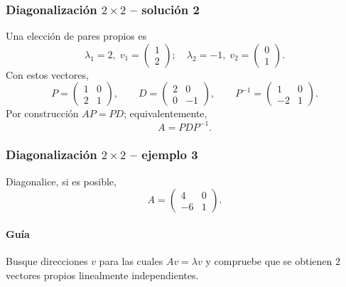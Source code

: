 \subsubsection*{Diagonalización $2\times 2$ -- solución 2}
\scriptsize
Una elección de pares propios es
\[
\lambda_1=2,\;v_1=\begin{pmatrix}1\\2\end{pmatrix};\quad \lambda_2=-1,\;v_2=\begin{pmatrix}0\\1\end{pmatrix}.
\]
Con estos vectores,
\[
P=\begin{pmatrix}1 & 0\\2 & 1\end{pmatrix},\qquad D=\begin{pmatrix}2 & 0\\0 & -1\end{pmatrix},\qquad P^{-1}=\begin{pmatrix}1 & 0\\-2 & 1\end{pmatrix}.
\]
Por construcción $AP=PD$; equivalentemente,
\[
\boxed{A=PDP^{-1}}.
\]


\subsubsection*{Diagonalización $2\times 2$ -- ejemplo 3}

Diagonalice, si es posible,
\[
A=\begin{pmatrix}4 & 0\\-6 & 1\end{pmatrix}.
\]

\paragraph{Guía}
Busque direcciones $v$ para las cuales $Av=\lambda v$ y compruebe que se obtienen $2$ vectores propios linealmente independientes.



